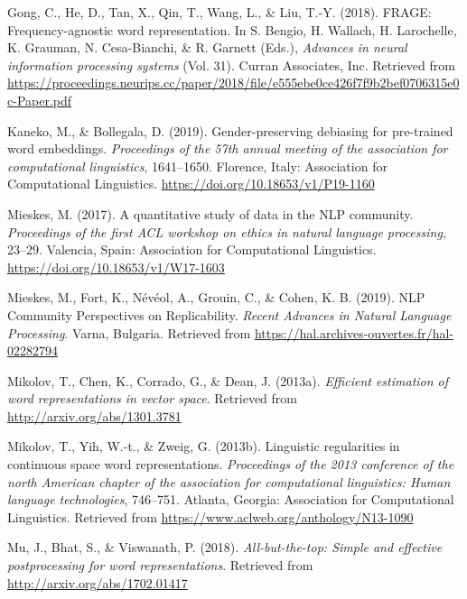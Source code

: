 \documentclass[
  english,
  man,floatsintext]{apa6}
\begin{document}
\leavevmode\hypertarget{ref-gong_2018}{}%
Gong, C., He, D., Tan, X., Qin, T., Wang, L., \& Liu, T.-Y. (2018). FRAGE: Frequency-agnostic word representation. In S. Bengio, H. Wallach, H. Larochelle, K. Grauman, N. Cesa-Bianchi, \& R. Garnett (Eds.), \emph{Advances in neural information processing systems} (Vol. 31). Curran Associates, Inc. Retrieved from \url{https://proceedings.neurips.cc/paper/2018/file/e555ebe0ce426f7f9b2bef0706315e0c-Paper.pdf}

\leavevmode\hypertarget{ref-kaneko_2019}{}%
Kaneko, M., \& Bollegala, D. (2019). Gender-preserving debiasing for pre-trained word embeddings. \emph{Proceedings of the 57th annual meeting of the association for computational linguistics}, 1641--1650. Florence, Italy: Association for Computational Linguistics. \url{https://doi.org/10.18653/v1/P19-1160}

\leavevmode\hypertarget{ref-mieskes_2017}{}%
Mieskes, M. (2017). A quantitative study of data in the NLP community. \emph{Proceedings of the first ACL workshop on ethics in natural language processing}, 23--29. Valencia, Spain: Association for Computational Linguistics. \url{https://doi.org/10.18653/v1/W17-1603}

\leavevmode\hypertarget{ref-mieskes_2019}{}%
Mieskes, M., Fort, K., Névéol, A., Grouin, C., \& Cohen, K. B. (2019). NLP Community Perspectives on Replicability. \emph{Recent Advances in Natural Language Processing}. Varna, Bulgaria. Retrieved from \url{https://hal.archives-ouvertes.fr/hal-02282794}

\leavevmode\hypertarget{ref-mikolov2013Google}{}%
Mikolov, T., Chen, K., Corrado, G., \& Dean, J. (2013a). \emph{Efficient estimation of word representations in vector space}. Retrieved from \url{http://arxiv.org/abs/1301.3781}

\leavevmode\hypertarget{ref-mikolov2013MSR}{}%
Mikolov, T., Yih, W.-t., \& Zweig, G. (2013b). Linguistic regularities in continuous space word representations. \emph{Proceedings of the 2013 conference of the north American chapter of the association for computational linguistics: Human language technologies}, 746--751. Atlanta, Georgia: Association for Computational Linguistics. Retrieved from \url{https://www.aclweb.org/anthology/N13-1090}

\leavevmode\hypertarget{ref-mu_2018}{}%
Mu, J., Bhat, S., \& Viswanath, P. (2018). \emph{All-but-the-top: Simple and effective postprocessing for word representations}. Retrieved from \url{http://arxiv.org/abs/1702.01417}
\end{document}
